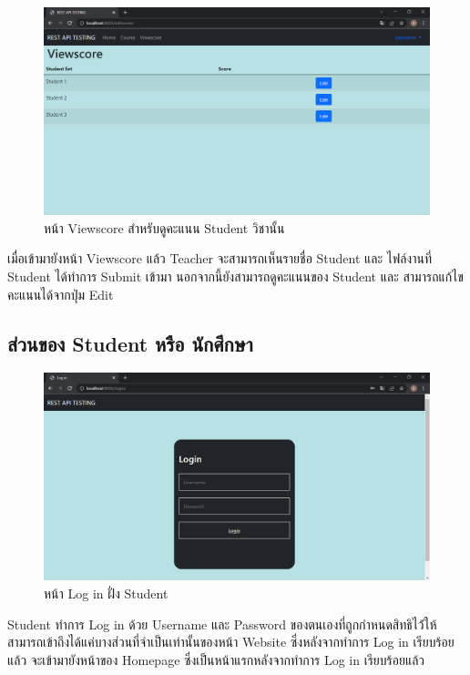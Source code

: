 \begin{figure}[H]
    \captionsetup{justification=centering}
    \centering
    \includegraphics[width=5in]{figures/chapter4/editscore.PNG}
    \caption{หน้า Viewscore สำหรับดูคะแนน Student วิชานั้น}
    \label{figure:viewscore}
\end{figure}
เมื่อเข้ามายังหน้า Viewscore แล้ว Teacher จะสามารถเห็นรายชื่อ Student และ ไฟล์งานที่ Student ได้ทำการ Submit เข้ามา นอกจากนี้ยังสามารถดูคะแนนของ Student และ สามารถแก้ไขคะแนนได้จากปุ่ม Edit
\newpage

\subsection{ส่วนของ Student หรือ นักศึกษา}

\begin{figure}[H]
    \captionsetup{justification=centering}
    \centering
    \includegraphics[width=5in]{figures/chapter4/login.PNG}
    \caption{หน้า Log in ฝั่ง Student}
    \label{figure:login2}
\end{figure}
Student ทำการ Log in ด้วย Username และ Password ของตนเองที่ถูกกำหนดสิทธิไว้่ให้สามารถเข้าถึงได้แค่บางส่วนที่จำเป็นเท่านั้นของหน้า Website ซึ่งหลังจากทำการ Log in เรียบร้อยแล้ว จะเข้ามายังหน้าของ Homepage ซึ่งเป็นหน้าแรกหลังจากทำการ Log in เรียบร้อยแล้ว

